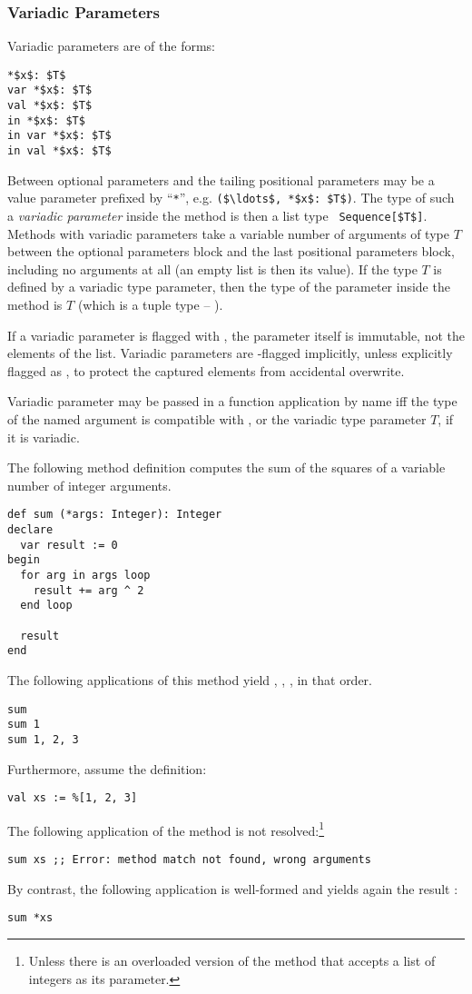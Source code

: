 \subsubsection{Variadic Parameters}
\label{sec:variadic-parameters}

Variadic parameters are of the forms:
\begin{lstlisting}
*$x$: $T$
var *$x$: $T$
val *$x$: $T$
in *$x$: $T$
in var *$x$: $T$
in val *$x$: $T$
\end{lstlisting}

Between optional parameters and the tailing positional parameters may be a value parameter prefixed by ``\lstinline!*!'', e.g. \lstinline!($\ldots$, *$x$: $T$)!. The type of such a {\em variadic parameter} inside the method is then a list type ~\lstinline!Sequence[$T$]!. Methods with variadic parameters take a variable number of arguments of type $T$ between the optional parameters block and the last positional parameters block, including no arguments at all (an empty list is then its value). If the type $T$ is defined by a variadic type parameter, then the type of the parameter inside the method is $T$ (which is a tuple type -- ). 

If a variadic parameter is flagged with , the parameter itself is immutable, not the elements of the list. Variadic parameters are -flagged implicitly, unless explicitly flagged as , to protect the captured elements from accidental overwrite. 

Variadic parameter may be passed in a function application by name iff the type of the named argument is compatible with , or the variadic type parameter $T$, if it is variadic. 

\example The following method definition computes the sum of the squares of a variable number of integer arguments.
\begin{lstlisting}
def sum (*args: Integer): Integer
declare
  var result := 0
begin
  for arg in args loop
    result += arg ^ 2
  end loop
  
  result
end
\end{lstlisting}
The following applications of this method yield , , , in that order.
\begin{lstlisting}
sum
sum 1
sum 1, 2, 3
\end{lstlisting}
Furthermore, assume the definition:
\begin{lstlisting}
val xs := %[1, 2, 3]
\end{lstlisting}
The following application of the method  is not resolved:\footnote{Unless there is an overloaded version of the method that accepts a list of integers as its parameter.}
\begin{lstlisting}
sum xs ;; Error: method match not found, wrong arguments
\end{lstlisting}
By contrast, the following application is well-formed and yields again the result :
\begin{lstlisting}
sum *xs
\end{lstlisting}






